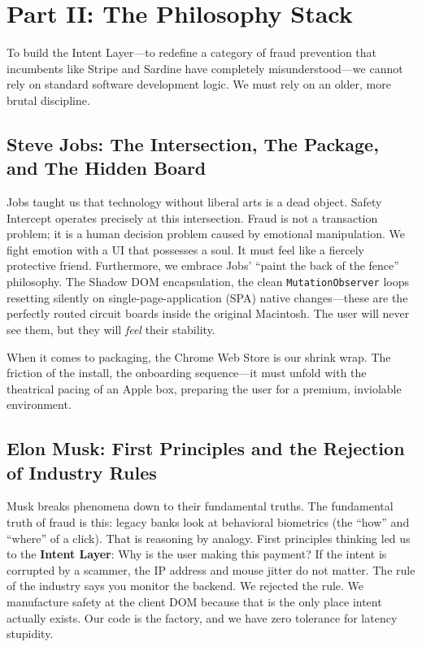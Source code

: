 \documentclass[11pt, letterpaper]{article}
\begin{document}
\section*{Part II: The Philosophy Stack}

To build the Intent Layer---to redefine a category of fraud prevention that incumbents like Stripe and Sardine have completely misunderstood---we cannot rely on standard software development logic. We must rely on an older, more brutal discipline.

\subsection*{Steve Jobs: The Intersection, The Package, and The Hidden Board}
Jobs taught us that technology without liberal arts is a dead object. Safety Intercept operates precisely at this intersection. Fraud is not a transaction problem; it is a human decision problem caused by emotional manipulation. We fight emotion with a UI that possesses a soul. It must feel like a fiercely protective friend. Furthermore, we embrace Jobs' ``paint the back of the fence'' philosophy. The Shadow DOM encapsulation, the clean \texttt{MutationObserver} loops resetting silently on single-page-application (SPA) native changes---these are the perfectly routed circuit boards inside the original Macintosh. The user will never see them, but they will \textit{feel} their stability. 

When it comes to packaging, the Chrome Web Store is our shrink wrap. The friction of the install, the onboarding sequence---it must unfold with the theatrical pacing of an Apple box, preparing the user for a premium, inviolable environment.

\subsection*{Elon Musk: First Principles and the Rejection of Industry Rules}
Musk breaks phenomena down to their fundamental truths. The fundamental truth of fraud is this: legacy banks look at behavioral biometrics (the ``how'' and ``where'' of a click). That is reasoning by analogy. First principles thinking led us to the \textbf{Intent Layer}: Why is the user making this payment? If the intent is corrupted by a scammer, the IP address and mouse jitter do not matter. The rule of the industry says you monitor the backend. We rejected the rule. We manufacture safety at the client DOM because that is the only place intent actually exists. Our code is the factory, and we have zero tolerance for latency stupidity. 
\end{document}
